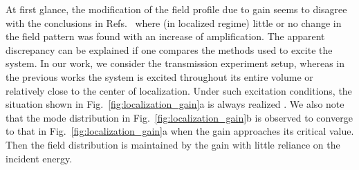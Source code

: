 At first glance, the modification of the field profile due to gain seems to disagree with the conclusions in Refs.~\cite{2002_Jiang_Loc_Modes_Lasing,2002_Sebbah_Vanneste,2005_Vanneste} where (in localized regime) little or no change in the field pattern was found with an increase of amplification. The apparent discrepancy can be explained if one compares the methods used to excite the system. In our work, we consider the transmission experiment setup, whereas in the previous works \cite{2002_Jiang_Loc_Modes_Lasing,2002_Sebbah_Vanneste,2005_Vanneste} the system is excited throughout its entire volume or relatively close to the center of localization. Under such excitation conditions, the situation shown in Fig.~\ref{fig:localization_gain}a is always realized \cite{2010_Payne_loc_criterion}. We also note that the mode distribution in Fig.~\ref{fig:localization_gain}b is observed to converge to that in Fig.~\ref{fig:localization_gain}a when the gain approaches its critical value. Then the field distribution is maintained by the gain with little reliance on the incident energy.


